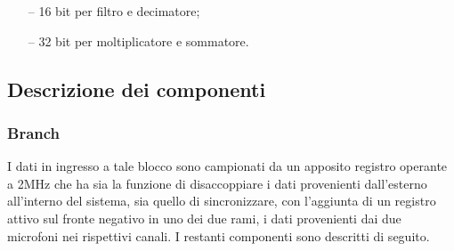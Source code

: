 \documentclass[a4paper, titlepage]{article}
\begin{document}
\begin{itemize}
    \item [--] 16 bit per filtro e decimatore;
    \item [--] 32 bit per moltiplicatore e sommatore.
\end{itemize}


\subsection{Descrizione dei componenti}
\subsubsection{\textbf{Branch}}
I dati in ingresso a tale blocco sono campionati da un apposito registro operante a 2MHz che ha sia la funzione di disaccoppiare i dati provenienti dall'esterno all'interno del sistema, sia quello di sincronizzare, con l'aggiunta di un registro attivo sul fronte negativo in uno dei due rami, i dati provenienti dai due microfoni nei rispettivi canali. I restanti componenti sono descritti di seguito.
\end{document}
